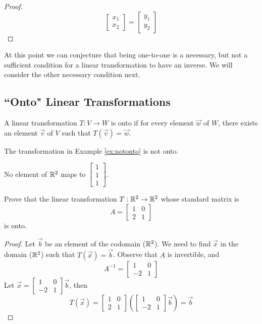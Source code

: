 \documentclass{ximera}
\begin{document}
\begin{example}
\begin{proof}
$$\begin{bmatrix}x_1\\x_2\end{bmatrix}=\begin{bmatrix}y_1\\y_2\end{bmatrix}$$
\end{proof}
\end{example}

At this point we can conjecture that being one-to-one is a necessary, but not a sufficient condition for a linear transformation to have an inverse.  We will consider the other necessary condition next.

\subsection*{``Onto" Linear Transformations}

\begin{definition}[Onto]\label{def:onto} A linear transformation $T:V\rightarrow W$ is onto if for every element $\vec{w}$ of $W$, there exists an element $\vec{v}$ of $V$ such that $T(\vec{v})=\vec{w}$.
\end{definition}

\begin{example}
The transformation in Example \ref{ex:notonto} is not onto.
\begin{explanation}
No element of $\mathbb{R}^2$ maps to $\begin{bmatrix}1\\1\\1\end{bmatrix}$.
\end{explanation}
\end{example}

\begin{example} Prove that the linear transformation $T:\mathbb{R}^2\rightarrow \mathbb{R}^2$ whose standard matrix is $$A=\begin{bmatrix}1&0\\2&1\end{bmatrix}$$ is onto.
\begin{proof} Let $\vec{b}$ be an element of the codomain ($\mathbb{R}^2$).  We need to find $\vec{x}$ in the domain ($\mathbb{R}^2$) such that $T(\vec{x})=\vec{b}$. 
Observe that $A$ is invertible, and $$A^{-1}=\begin{bmatrix}1&0\\-2&1\end{bmatrix}$$
 Let $\vec{x}=\begin{bmatrix}1&0\\-2&1\end{bmatrix}\vec{b}$, then 
 $$T(\vec{x})=\begin{bmatrix}1&0\\2&1\end{bmatrix}\left(\begin{bmatrix}1&0\\-2&1\end{bmatrix}\vec{b}\right)=\vec{b}$$
\end{proof}
\end{example}
\end{document}
